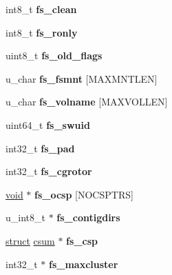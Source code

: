 \begin{DoxyCompactItemize}
\mbox{\label{structfs_ad70b3b14f20ee12639f774ce0a6817b0}} 
int8\+\_\+t {\bfseries fs\+\_\+clean}
\item 
\mbox{\label{structfs_ac4a00ffe190e24cf27323062dd3c4b04}} 
int8\+\_\+t {\bfseries fs\+\_\+ronly}
\item 
\mbox{\label{structfs_ac6cebda1fb0667d0087328036188bd70}} 
uint8\+\_\+t {\bfseries fs\+\_\+old\+\_\+flags}
\item 
\mbox{\label{structfs_a395b45d15be4a5d7e84ca5d4ea73deab}} 
u\+\_\+char {\bfseries fs\+\_\+fsmnt} \mbox{[}M\+A\+X\+M\+N\+T\+L\+EN\mbox{]}
\item 
\mbox{\label{structfs_a37e5fc9327d9b06a1935ae3829000ab6}} 
u\+\_\+char {\bfseries fs\+\_\+volname} \mbox{[}M\+A\+X\+V\+O\+L\+L\+EN\mbox{]}
\item 
\mbox{\label{structfs_a3ade91d3ff64983d81914e75bb010f58}} 
uint64\+\_\+t {\bfseries fs\+\_\+swuid}
\item 
\mbox{\label{structfs_a2cb27fb4a6379e89a430db9f9d51eda5}} 
int32\+\_\+t {\bfseries fs\+\_\+pad}
\item 
\mbox{\label{structfs_a30411c307e72e31cec612a97b004453e}} 
int32\+\_\+t {\bfseries fs\+\_\+cgrotor}
\item 
\mbox{\label{structfs_a814cac059e01d1b213dcd140cc271f16}} 
\hyperlink{interfacevoid}{void} $\ast$ {\bfseries fs\+\_\+ocsp} \mbox{[}N\+O\+C\+S\+P\+T\+RS\mbox{]}
\item 
\mbox{\label{structfs_ad7440c4ded770a821535ad723d30f74a}} 
u\+\_\+int8\+\_\+t $\ast$ {\bfseries fs\+\_\+contigdirs}
\item 
\mbox{\label{structfs_a4b9c3e77f89f5a59f71e37f83b8d42aa}} 
\hyperlink{interfacestruct}{struct} \hyperlink{structcsum}{csum} $\ast$ {\bfseries fs\+\_\+csp}
\item 
\mbox{\label{structfs_a50ffe84a85ce08275f6ca6f585cfe3c8}} 
int32\+\_\+t $\ast$ {\bfseries fs\+\_\+maxcluster}

\end{DoxyCompactItemize}

